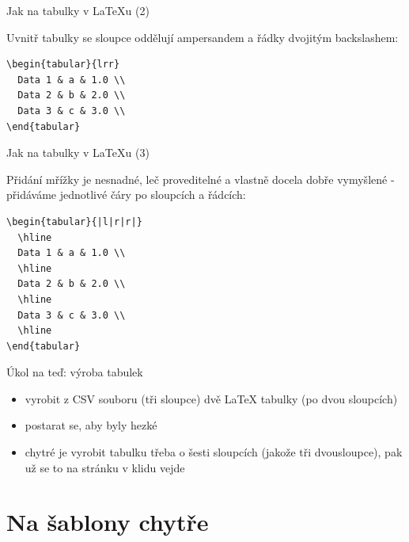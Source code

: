\documentclass{beamer}
\begin{document}
\begin{frame}[fragile]{Jak na tabulky v LaTeXu (2)}
  \begin{block}{ }
    Uvnitř tabulky se sloupce oddělují ampersandem a řádky dvojitým backslashem:
    \scriptsize
    \begin{verbatim}
\begin{tabular}{lrr}
  Data 1 & a & 1.0 \\
  Data 2 & b & 2.0 \\
  Data 3 & c & 3.0 \\
\end{tabular}
    \end{verbatim}
  \end{block}
\end{frame}

\begin{frame}[fragile]{Jak na tabulky v LaTeXu (3)}
  \begin{block}{ }
    Přidání mřížky je nesnadné, leč proveditelné a vlastně docela dobře vymyšlené - přidáváme jednotlivé čáry po sloupcích a řádcích:
    \scriptsize
    \begin{verbatim}
\begin{tabular}{|l|r|r|}
  \hline
  Data 1 & a & 1.0 \\
  \hline
  Data 2 & b & 2.0 \\
  \hline
  Data 3 & c & 3.0 \\
  \hline
\end{tabular}
    \end{verbatim}
  \end{block}
\end{frame}

\begin{frame}{Úkol na teď: výroba tabulek}
  \begin{itemize}
    \item vyrobit z CSV souboru (tři sloupce) dvě LaTeX tabulky (po dvou sloupcích)
    \item postarat se, aby byly hezké
    \item chytré je vyrobit tabulku třeba o šesti sloupcích (jakože tři dvousloupce), pak už se to na stránku v klidu vejde
  \end{itemize}
\end{frame}

%
%
%
%


\section{Na šablony chytře}
\end{document}
